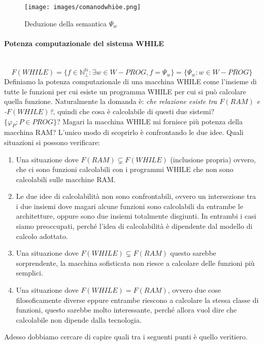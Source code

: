 \documentclass{article}
\begin{document}
\begin{figure}[H]
    \centering
    \texttt{[image: images/comanodwhiòe.png]}
    \caption{Deduzione della semantica $\Psi_w$}
\end{figure}

\paragraph{Potenza computazionale del sistema WHILE}\mbox{}\\
$$F(WHILE)=\{f\in\mathbb{N}_\bot^\mathbb{N} : \exists w\in W-PROG, f=\Psi_w\}=\{\Psi_w : w\in W-PROG\}$$
Definiamo la potenza computazionale di
una macchina WHILE come l'insieme di tutte le funzioni per cui
esiste un programma WHILE per cui si può calcolare quella funzione.
Naturalmente la domanda è: \textit{che relazione esiste tra $F(RAM)$ e -$F(WHILE)$?}, quindi
che cosa è calcolabile di questi due sistemi? $\{\varphi_P:P\in PROG\}$?
Magari la macchina WHILE mi fornisce più potenza della macchina RAM? L'unico modo di scoprirlo
è confrontando le due idee. Quali situazioni si possono verificare:
\begin{enumerate}
    \item Una situazione dove $F(RAM)\subsetneq F(WHILE)$ (inclusione propria) ovvero, che ci sono funzioni
          calcolabili con i programmi WHILE che non sono calcolabili sulle macchine RAM.

    \item Le due idee di calcolabilità non sono confrontabili, ovvero un intersezione tra i due insiemi
          dove magari alcune funzioni sono calcolabili da entrambe le architetture, oppure sono due insiemi
          totalmente disgiunti. In entrambi i casi siamo preoccupati, perché l'idea di calcolabilità è dipendente
          dal modello di calcolo adottato.

    \item Una situazione dove $F(WHILE)\subsetneq F(RAM)$ questo sarebbe sorprendente, la macchina
          sofisticata non riesce a calcolare delle funzioni più semplici.

    \item Una situazione dove $F(WHILE)=F(RAM)$, ovvero due cose filosoficamente diverse eppure entrambe
          riescono a calcolare la stessa classe di funzioni, questo sarebbe molto interessante, perché allora
          vuol dire che calcolabile non dipende dalla tecnologia.
\end{enumerate}
Adesso dobbiamo cercare di capire quali tra i seguenti punti è quello veritiero.
\end{document}
